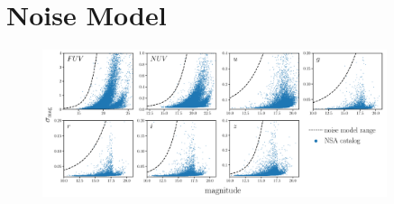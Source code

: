 \section{Noise Model}  \label{sec:noise} 


\begin{figure}
\begin{center}
\includegraphics[width=0.9\textwidth]{figs/noise.pdf}
    \caption{\label{fig:noise}
    }
\end{center}
\end{figure}


